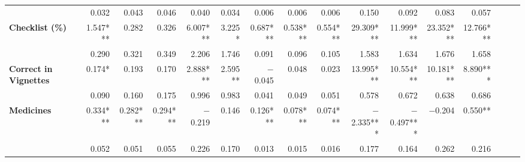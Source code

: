 \begin{tabular}{@{\extracolsep{5pt}}lrrrrrrrrrrrrrrr}
{\bf } & 0.032\phantom{\phantom{)}***} & 0.043\phantom{\phantom{)}***} & 0.046\phantom{\phantom{)}***} & 0.040\phantom{\phantom{)}***} & 0.034\phantom{\phantom{)}***} & 0.006\phantom{\phantom{)}***} & 0.006\phantom{\phantom{)}***} & 0.006\phantom{\phantom{)}***} & 0.150\phantom{\phantom{)}***} & 0.092\phantom{\phantom{)}***} & 0.083\phantom{\phantom{)}***} & 0.057\phantom{\phantom{)}***} \\
{\bf Checklist (\%)} & 1.547\phantom{)}*** & 0.282\phantom{\phantom{)}***} & 0.326\phantom{\phantom{)}***} & 6.007\phantom{)}*** & 3.225\phantom{)}*\phantom{**} & 0.687\phantom{)}*** & 0.538\phantom{)}*** & 0.554\phantom{)}*** & 29.309\phantom{)}*** & 11.999\phantom{)}*** & 23.352\phantom{)}*** & 12.766\phantom{)}*** \\
{\bf } & 0.290\phantom{\phantom{)}***} & 0.321\phantom{\phantom{)}***} & 0.349\phantom{\phantom{)}***} & 2.206\phantom{\phantom{)}***} & 1.746\phantom{\phantom{)}***} & 0.091\phantom{\phantom{)}***} & 0.096\phantom{\phantom{)}***} & 0.105\phantom{\phantom{)}***} & 1.583\phantom{\phantom{)}***} & 1.634\phantom{\phantom{)}***} & 1.676\phantom{\phantom{)}***} & 1.658\phantom{\phantom{)}***} \\
{\bf Correct in Vignettes} & 0.174\phantom{)}*\phantom{**} & 0.193\phantom{\phantom{)}***} & 0.170\phantom{\phantom{)}***} & 2.888\phantom{)}*** & 2.595\phantom{)}**\phantom{*} & $-$0.045\phantom{\phantom{)}***} & 0.048\phantom{\phantom{)}***} & 0.023\phantom{\phantom{)}***} & 13.995\phantom{)}*** & 10.554\phantom{)}*** & 10.181\phantom{)}*** & 8.890\phantom{)}*** \\
{\bf } & 0.090\phantom{\phantom{)}***} & 0.160\phantom{\phantom{)}***} & 0.175\phantom{\phantom{)}***} & 0.996\phantom{\phantom{)}***} & 0.983\phantom{\phantom{)}***} & 0.041\phantom{\phantom{)}***} & 0.049\phantom{\phantom{)}***} & 0.051\phantom{\phantom{)}***} & 0.578\phantom{\phantom{)}***} & 0.672\phantom{\phantom{)}***} & 0.638\phantom{\phantom{)}***} & 0.686\phantom{\phantom{)}***} \\
{\bf Medicines} & 0.334\phantom{)}*** & 0.282\phantom{)}*** & 0.294\phantom{)}*** & $-$0.219\phantom{\phantom{)}***} & 0.146\phantom{\phantom{)}***} & 0.126\phantom{)}*** & 0.078\phantom{)}*** & 0.074\phantom{)}*** & $-$2.335\phantom{)}*** & $-$0.497\phantom{)}*** & $-$0.204\phantom{\phantom{)}***} & 0.550\phantom{)}**\phantom{*} \\
{\bf } & 0.052\phantom{\phantom{)}***} & 0.051\phantom{\phantom{)}***} & 0.055\phantom{\phantom{)}***} & 0.226\phantom{\phantom{)}***} & 0.170\phantom{\phantom{)}***} & 0.013\phantom{\phantom{)}***} & 0.015\phantom{\phantom{)}***} & 0.016\phantom{\phantom{)}***} & 0.177\phantom{\phantom{)}***} & 0.164\phantom{\phantom{)}***} & 0.262\phantom{\phantom{)}***} & 0.216\phantom{\phantom{)}***} \\

\end{tabular}
